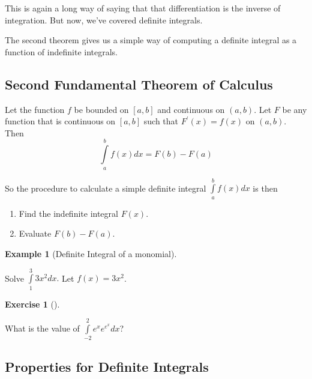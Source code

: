 \documentclass[
  letterpaper,
]{book}
\providecommand{\tightlist}{%
  \setlength{\itemsep}{0pt}\setlength{\parskip}{0pt}}\usepackage{longtable,booktabs,array}
\theoremstyle{definition}
\theoremstyle{definition}
\newtheorem{example}{Example}[chapter]
\theoremstyle{plain}
\theoremstyle{definition}
\newtheorem{exercise}{Exercise}[chapter]
\theoremstyle{plain}
\theoremstyle{plain}
\theoremstyle{remark}
\begin{document}
This is again a long way of saying that that differentiation is the
inverse of integration. But now, we've covered definite integrals.

The second theorem gives us a simple way of computing a definite
integral as a function of indefinite integrals.

\hypertarget{thm}{}
\hypertarget{second-fundamental-theorem-of-calculus}{%
\subsection{Second Fundamental Theorem of
Calculus}\label{second-fundamental-theorem-of-calculus}}

Let the function \(f\) be bounded on \([a,b]\) and continuous on
\((a,b)\). Let \(F\) be any function that is continuous on \([a,b]\)
such that \(F^\prime(x)=f(x)\) on \((a,b)\). Then
\[\int\limits_a^bf(x)dx = F(b)-F(a)\]

So the procedure to calculate a simple definite integral
\(\int\limits_a^b f(x)dx\) is then

\begin{enumerate}
\def\labelenumi{\arabic{enumi}.}
\tightlist
\item
  Find the indefinite integral \(F(x)\).
\item
  Evaluate \(F(b)-F(a)\).
\end{enumerate}

\leavevmode{}%
\begin{example}[Definite Integral of a monomial]\label{exm-defintmon}

Solve \(\int\limits_1^3 3x^2 dx.\) Let \(f(x) = 3x^2\).

\end{example}

\leavevmode{}%
\begin{exercise}[]\label{exr-}

What is the value of \(\int\limits_{-2}^2 e^x e^{e^x} dx\)?

\end{exercise}

\hypertarget{properties-for-definite-integrals}{%
\subsection*{Properties for Definite
Integrals}\label{properties-for-definite-integrals}}
\end{document}
